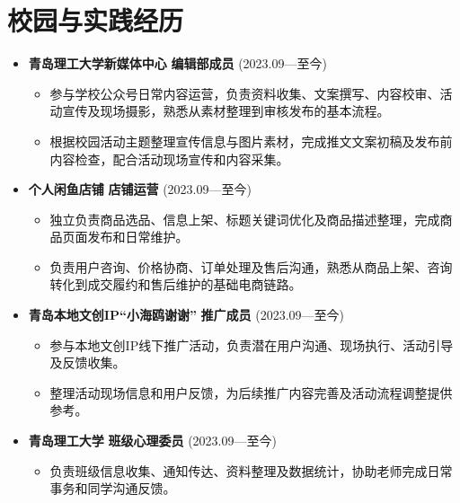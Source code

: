 \documentclass[a4paper,11pt]{article}
\begin{document}
\section*{校园与实践经历}
\begin{itemize}[leftmargin=*,itemsep=2pt]
  \item \textbf{青岛理工大学新媒体中心} \hfill \textbf{编辑部成员} (2023.09—至今)
  \begin{itemize}[leftmargin=*,itemsep=1pt]
    \item 参与学校公众号日常内容运营，负责资料收集、文案撰写、内容校审、活动宣传及现场摄影，熟悉从素材整理到审核发布的基本流程。
    \item 根据校园活动主题整理宣传信息与图片素材，完成推文文案初稿及发布前内容检查，配合活动现场宣传和内容采集。
  \end{itemize}
\end{itemize}
\begin{itemize}[leftmargin=*,itemsep=2pt]
  \item \textbf{个人闲鱼店铺} \hfill \textbf{店铺运营} (2023.09—至今)
  \begin{itemize}[leftmargin=*,itemsep=1pt]
    \item 独立负责商品选品、信息上架、标题关键词优化及商品描述整理，完成商品页面发布和日常维护。
    \item 负责用户咨询、价格协商、订单处理及售后沟通，熟悉从商品上架、咨询转化到成交履约和售后维护的基础电商链路。
  \end{itemize}
\end{itemize}
\begin{itemize}[leftmargin=*,itemsep=2pt]
  \item \textbf{青岛本地文创IP“小海鸥谢谢”} \hfill \textbf{推广成员} (2023.09—至今)
  \begin{itemize}[leftmargin=*,itemsep=1pt]
    \item 参与本地文创IP线下推广活动，负责潜在用户沟通、现场执行、活动引导及反馈收集。
    \item 整理活动现场信息和用户反馈，为后续推广内容完善及活动流程调整提供参考。
  \end{itemize}
\end{itemize}
\begin{itemize}[leftmargin=*,itemsep=2pt]
  \item \textbf{青岛理工大学} \hfill \textbf{班级心理委员} (2023.09—至今)
  \begin{itemize}[leftmargin=*,itemsep=1pt]
    \item 负责班级信息收集、通知传达、资料整理及数据统计，协助老师完成日常事务和同学沟通反馈。
  \end{itemize}
\end{itemize}
\end{document}
